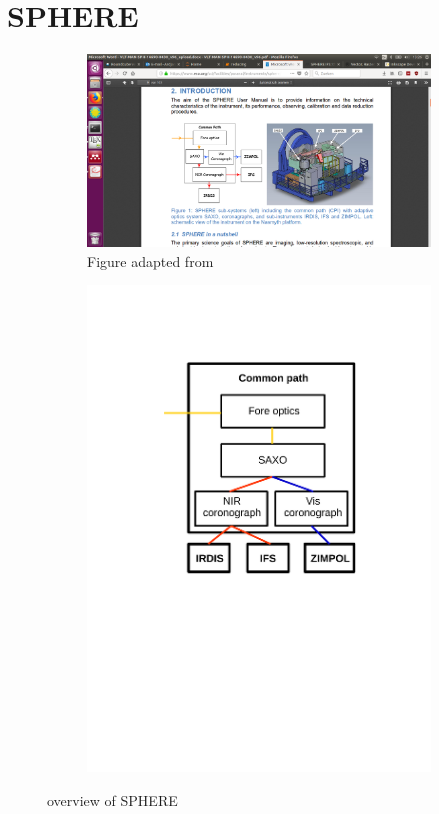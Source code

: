 \documentclass[twoside,single]{lion-msc}
\begin{document}
\section{SPHERE}
\begin{figure}[hb]
\centering
\begin{subfigure}{.58\textwidth}
  \centering
  \includegraphics[trim={25cm 6cm 7cm 8.8cm},clip,width = 1\linewidth]{overviewSPHERE}
  \caption{Figure adapted from \citep{Observatory2007}}
\end{subfigure}\hfill
\begin{subfigure}{.38\textwidth}
  \centering
  \includegraphics[trim={5cm 12cm 3.5cm 3.5cm},clip,width=1\linewidth]{overview_SPHERE}
  \caption{}
\end{subfigure}
\caption{overview of SPHERE}
\label{fig:overviewSPHERE}
\end{figure}
\end{document}
